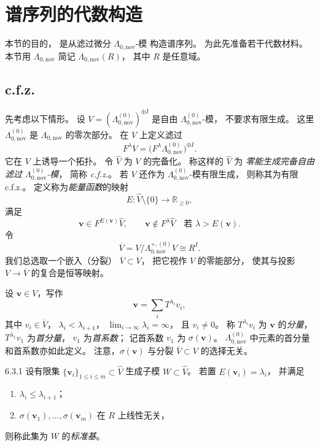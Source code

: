 
\section{谱序列的代数构造}
\label{sec:6-3}

本节的目的，
是从滤过微分 $\Lambda_{0,\mathrm{nov}}$-模
构造谱序列。
为此先准备若干代数材料。
本节用 $\Lambda_{0,\mathrm{nov}}$
简记 $\Lambda_{0,\mathrm{nov}}(R)$，
其中 $R$ 是任意域。

\subsection{c.f.z.}
\label{subsec:6-3-1}

先考虑以下情形。
设
$V=(\Lambda_{0,\mathrm{nov}}^{(0)})^{\oplus I}$
是自由 $\Lambda_{0,\mathrm{nov}}^{(0)}$-模，
不要求有限生成。
这里 $\Lambda_{0,\mathrm{nov}}^{(0)}$
是 $\Lambda_{0,\mathrm{nov}}$ 的零次部分。
在 $V$ 上定义滤过
\[
F^\lambda V
=\bigl(F^\lambda
\Lambda_{0,\mathrm{nov}}^{(0)}\bigr)^{\oplus I}.
\]
它在 $V$ 上诱导一个拓扑。
令 $\widehat V$ 为 $V$ 的完备化。
称这样的 $\widehat V$ 为
\emph{零能生成完备自由滤过
$\Lambda_{0,\mathrm{nov}}^{(0)}$-模}，
简称 \emph{c.f.z.}。
若 $V$ 还作为
$\Lambda_{0,\mathrm{nov}}^{(0)}$-模有限生成，
则称其为有限 c.f.z.。
定义称为\emph{能量函数}的映射
\[
E:\widehat V\setminus\{0\}
\longrightarrow\mathbb R_{\ge0},
\]
满足
\[
\mathbf v\in F^{E(\mathbf v)}\widehat V,
\qquad
\mathbf v\notin F^\lambda\widehat V
\quad\text{若 }\lambda>E(\mathbf v).
\]
令
\[
\overline V
=V/\Lambda_{0,\mathrm{nov}}^{+,(0)}V
\cong R^I.
\]
我们总选取一个嵌入（分裂）
$\overline V\subset V$，
把它视作 $V$ 的零能部分，
使其与投影
$V\to\overline V$ 的复合是恒等映射。

设 $\mathbf v\in V$，写作
\[
\mathbf v=\sum_iT^{\lambda_i}v_i,
\]
其中 $v_i\in\overline V$，
$\lambda_i<\lambda_{i+1}$，
$\lim_{i\to\infty}\lambda_i=\infty$，
且 $v_i\ne0$。
称 $T^{\lambda_i}v_i$ 为 $\mathbf v$ 的\emph{分量}，
$T^{\lambda_1}v_1$ 为\emph{首分量}，
$v_1$ 为\emph{首系数}；
记首系数 $v_1$ 为 $\sigma(\mathbf v)$。
$\Lambda_{0,\mathrm{nov}}^{(0)}$
中元素的首分量和首系数亦如此定义。
注意，$\sigma(\mathbf v)$
与分裂 $\overline V\subset V$ 的选择无关。

\begin{definition}{6.3.1}\label{def:6-3-1}
设有限集
$\{\mathbf v_i\}_{1\le i\le m}\subset\widehat V$
生成子模 $W\subset\widehat V$。
若置 $E(\mathbf v_i)=\lambda_i$，
并满足
\begin{enumerate}[label=\textup{(6.3.1.\arabic*)},leftmargin=5.8em]
\item $\lambda_i\le\lambda_{i+1}$；
\item $\sigma(\mathbf v_1),\ldots,
\sigma(\mathbf v_m)$ 在 $R$ 上线性无关，
\end{enumerate}
则称此集为 $W$ 的\emph{标准基}。
\end{definition}

